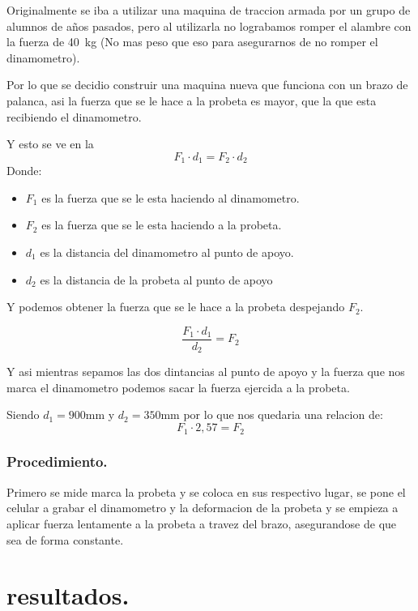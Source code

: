 \documentclass[12pt,a4paper]{article}
\begin{document}
Originalmente se iba a utilizar una maquina de traccion armada por un grupo de alumnos de años pasados, pero al utilizarla no lograbamos romper el alambre con la fuerza de \SI{40}{\kilogram} (No mas peso que eso para asegurarnos de no romper el dinamometro).

Por lo que se decidio construir una maquina nueva que funciona con un brazo de palanca, asi la fuerza que se le hace a la probeta es mayor, que la que esta recibiendo el dinamometro.

Y esto se ve en la 
\begin{equation}
    F_1\cdot d_1 = F_2\cdot d_2
    \label{eq:palanca}
\end{equation}
Donde:
\begin{itemize}
    \item $F_1$ es la fuerza que se le esta haciendo al dinamometro.
    \item $F_2$ es la fuerza que se le esta haciendo a la probeta.
    \item $d_1$ es la distancia del dinamometro al punto de apoyo.
    \item $d_2$ es la distancia de la probeta al punto de apoyo 
\end{itemize}

Y podemos obtener la fuerza que se le hace a la probeta despejando $F_2$.

\begin{equation}
    \frac{F_1\cdot d_1}{d_2} = F_2
\end{equation}

Y asi mientras sepamos las dos dintancias al punto de apoyo y la fuerza que nos marca el dinamometro podemos sacar la fuerza ejercida a la probeta.

Siendo $d_1 = 900$mm y $d_2 = 350$mm por lo que nos quedaria una relacion de:
\begin{equation}
    F_1 \cdot 2,57 = F_2
\end{equation}
\subsubsection{Procedimiento.}
Primero se mide marca la probeta y se coloca en sus respectivo lugar, se pone el celular a grabar el dinamometro y la deformacion de la probeta y se empieza a aplicar fuerza lentamente a la probeta a travez del brazo, asegurandose de que sea de forma constante.
\section{resultados.}
\end{document}
